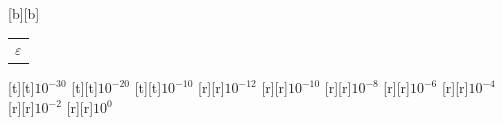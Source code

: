 \begin{psfrags}
[b][b]{\color[rgb]{0,0,0}\setlength{\tabcolsep}{0pt}\begin{tabular}{c}{\Large{$\varepsilon$}}\end{tabular}}%
%
[t][t]{$10^{-30}$}%
[t][t]{$10^{-20}$}%
[t][t]{$10^{-10}$}%
%
[r][r]{$10^{-12}$}%
[r][r]{$10^{-10}$}%
[r][r]{$10^{-8}$}%
[r][r]{$10^{-6}$}%
[r][r]{$10^{-4}$}%
[r][r]{$10^{-2}$}%
[r][r]{$10^{0}$}%
%
%
\end{psfrags}%
%
